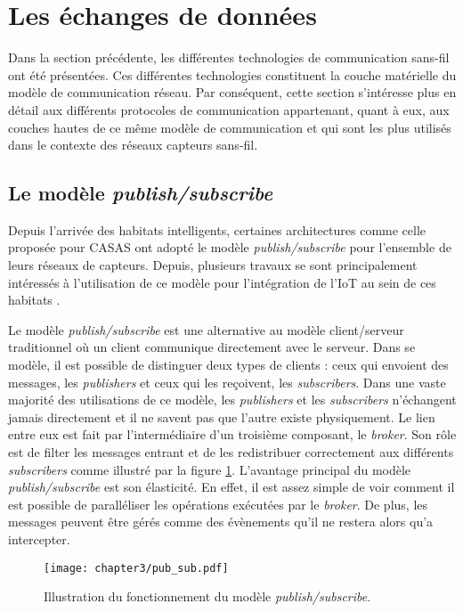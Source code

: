 \section{Les échanges de données}

Dans la section précédente, les différentes technologies de communication sans-fil ont été présentées. Ces différentes technologies constituent la couche matérielle du modèle de communication réseau. Par conséquent, cette section s'intéresse plus en détail aux différents protocoles de communication appartenant, quant à eux, aux couches hautes de ce même modèle de communication et qui sont les plus utilisés dans le contexte des réseaux capteurs sans-fil.

\subsection{Le modèle \textit{publish/subscribe}}

Depuis l'arrivée des habitats intelligents, certaines architectures comme celle proposée pour CASAS \citep{Cook2013} ont adopté le modèle \textit{publish/subscribe} pour l'ensemble de leurs réseaux de capteurs. Depuis, plusieurs travaux se sont principalement intéressés à l'utilisation de ce modèle pour l'intégration de l'\acs{IoT} au sein de ces habitats \citep{Lee2014, Upadhyay2016, VandenBossche2018}.

Le modèle \textit{publish/subscribe} est une alternative au modèle client/serveur traditionnel où un client communique directement avec le serveur. Dans se modèle, il est possible de distinguer deux types de clients : ceux qui envoient des messages, les \textit{publishers} et ceux qui les reçoivent, les \textit{subscribers}. Dans une vaste majorité des utilisations de ce modèle, les \textit{publishers} et les \textit{subscribers} n'échangent jamais directement et il ne savent pas que l'autre existe physiquement. Le lien entre eux est fait par l'intermédiaire d'un troisième composant, le \textit{broker}. Son rôle est de filter les messages entrant et de les redistribuer correctement aux différents \textit{subscribers} comme illustré par la figure \ref{fig:pub_sub}. L'avantage principal du modèle \textit{publish/subscribe} est son élasticité. En effet, il est assez simple de voir comment il est possible de paralléliser les opérations exécutées par le \textit{broker}. De plus, les messages peuvent être gérés comme des évènements qu'il ne restera alors qu'a intercepter.

\begin{figure}[H]
	\centering
	\texttt{[image: chapter3/pub\_sub.pdf]}
        \caption{Illustration du fonctionnement du modèle \textit{publish/subscribe}.}
	\label{fig:pub_sub}
\end{figure}

